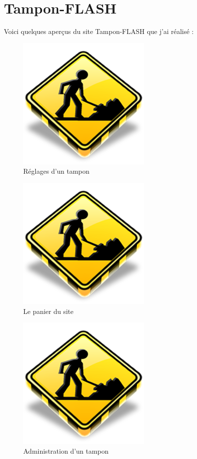 \chapter{Tampon-FLASH}
Voici quelques aperçus du site Tampon-FLASH que j'ai réalisé :

\begin{figure}[h!]
	\begin{center}
		\includegraphics[scale=1]{Contenu/Annexes/Images/TamponFLASH_Index.png}
	\end{center}

	\caption{Réglages d'un tampon}
	\label{calendrier}
\end{figure}

\begin{figure}[h!]
	\begin{center}
		\includegraphics[scale=1]{Contenu/Annexes/Images/TamponFLASH_Panier.png}
	\end{center}

	\caption{Le panier du site}
	\label{calendrier}
\end{figure}

\begin{figure}[h!]
	\begin{center}
		\includegraphics[scale=1]{Contenu/Annexes/Images/TamponFLASH_Admin.png}
	\end{center}

	\caption{Administration d'un tampon}
	\label{calendrier}
\end{figure}
